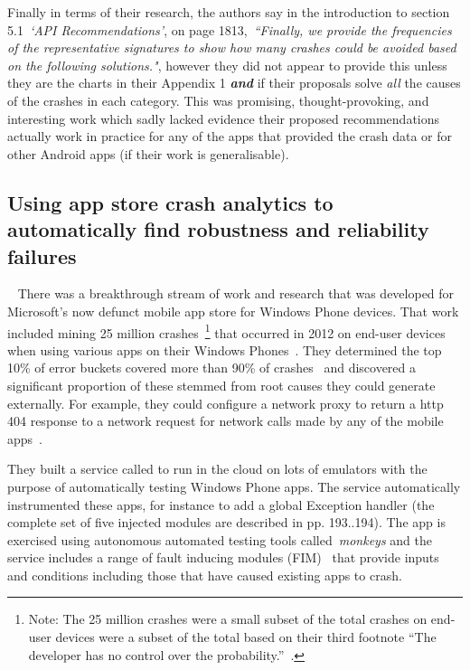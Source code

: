 Finally in terms of their research, the authors say in the introduction to section 5.1~\emph{`API Recommendations'}, on page 1813,~\emph{``Finally, we provide the frequencies of the representative signatures to show how many crashes could be avoided based on the following solutions."}, however they did not appear to provide this unless they are the charts in their Appendix 1 \textbf{\emph{and}} if their proposals solve \emph{all} the causes of the crashes in each category. This was promising, thought-provoking, and interesting work which sadly lacked evidence their proposed recommendations actually work in practice for any of the apps that provided the crash data or for other Android apps (if their work is generalisable).


\subsection{Using app store crash analytics to automatically find robustness and reliability failures}~\label{rw-windows-phone-store-crash-analysis-section}
There was a breakthrough stream of work and research that was developed for Microsoft's now defunct mobile app store for Windows Phone devices. That work included mining 25 million crashes~\footnote{Note: The 25 million crashes were a small subset of the total crashes on end-user devices were a subset of the total based on their third footnote ``The developer has no control over the probability.''~\cite[p. 191]{ravindrath2014_automatic_and_scalable_fault_detection_for_mobile_apps}.} that occurred in 2012 on end-user devices when using various apps on their Windows Phones~. They determined the top 10\% of error buckets covered more than 90\% of crashes~ and discovered a significant proportion of these stemmed from root causes they could generate externally. For example, they could configure a network proxy to return a \Gls{http} 404 response to a network request for network calls made by any of the mobile apps~.

They built a service called  to run in the cloud on lots of  emulators with the purpose of automatically testing Windows Phone apps. The service automatically instrumented these apps, for instance to add a global Exception handler (the complete set of five injected modules are described in pp. 193..194). The app is exercised using autonomous automated testing tools called~\emph{monkeys} and the service includes a range of fault inducing modules (FIM)~ that provide inputs and conditions including those that have caused existing apps to crash. 

